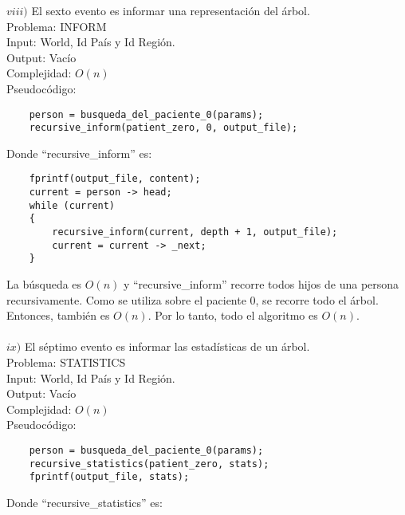 \documentclass[letter]{article}
\begin{document}
\begin{parte}{1}
	\noindent
	$viii)$ El sexto evento es informar una representación del árbol.\\
	
	\noindent
	Problema: INFORM\\
	Input: World, Id País y Id Región.\\
	Output: Vacío\\
	Complejidad: $O(n)$\\
	Pseudocódigo:
	
	\begin{lstlisting}
	person = busqueda_del_paciente_0(params);
	recursive_inform(patient_zero, 0, output_file);
	\end{lstlisting}
	\vspace{0.2cm}
	
	Donde ``recursive\_inform'' es:\\
	
	\begin{lstlisting}
	fprintf(output_file, content);
	current = person -> head;
	while (current)
	{
		recursive_inform(current, depth + 1, output_file);
		current = current -> _next;
	}
	\end{lstlisting}
	\vspace{0.2cm}
	
	La búsqueda es $O(n)$ y ``recursive\_inform'' recorre todos hijos de una persona recursivamente. Como se utiliza sobre el paciente 0, se recorre todo el árbol. Entonces, también es $O(n)$. Por lo tanto, todo el algoritmo es $O(n)$.\\\\
	
	\noindent
	$ix)$ El séptimo evento es informar las estadísticas de un árbol.\\
	
	\noindent
	Problema: STATISTICS\\
	Input: World, Id País y Id Región.\\
	Output: Vacío\\
	Complejidad: $O(n)$\\
	Pseudocódigo:
	
	\begin{lstlisting}
	person = busqueda_del_paciente_0(params);
	recursive_statistics(patient_zero, stats);
	fprintf(output_file, stats);
	\end{lstlisting}
	\vspace{0.2cm}
	
	\pagebreak
	
	Donde ``recursive\_statistics'' es:\\
	

\end{parte}
\end{document}
